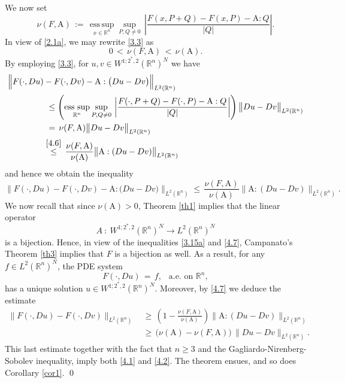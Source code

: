 \documentclass{amsart}
\theoremstyle{definition}
\numberwithin{equation}{section}
\begin{document}
We now set
\[
\nu(F,{\textrm{A}})\, :=\, \underset{x\in {\mathbb{R}}^n}{{\textrm{ess}}\,\sup} \sup_{P,Q\neq 0}\,\left| \frac{F(x,P+Q) -F(x,P) -{\textrm{A}}:Q}{|Q|}\right| .
\]
In view of \eqref{2.1a}, we may rewrite  \eqref{3.3}  as
\begin{equation} \label{3.15a}
0\,<\,  \nu(F,{\textrm{A}})\, <\, \nu({\textrm{A}}).
\end{equation}
By employing \eqref{3.3}, for $u,v \in W^{1;2^*\!,2}({\mathbb{R}}^n)^N$ we have
\begin{align} 
\Big\|F(\cdot,Du) &-  F(\cdot,Dv)  -{\textrm{A}}: \big(Du-Dv \big)\Big\|_{L^2({\mathbb{R}}^n)} \nonumber\\
&\ \leq \left(\underset{{\mathbb{R}}^n}{{\textrm{ess}}\,\sup} \sup_{P,Q\neq 0}\,\left| \frac{F(\cdot,P+Q) -F(\cdot,P) -{\textrm{A}}:Q}{|Q|}\right| \right)
\big\| Du-Dv\big\|_{L^2({\mathbb{R}}^n)}  \nonumber\\
&\ = \, \nu(F,{\textrm{A}}) \big\| Du-Dv\big\|_{L^2({\mathbb{R}}^n)} \nonumber\\
&\overset{\eqref{4.6}}{\leq}\, \frac{\nu(F,{\textrm{A}})}{\nu({\textrm{A}})} \big\|{\textrm{A}}:(Du -Dv)\big\|_{L^2({\mathbb{R}}^n)} \nonumber
\end{align}
and hence we obtain the inequality
\begin{equation}   \label{4.7}
\Big\|F(\cdot,Du) -  F(\cdot,Dv)  -{\textrm{A}}: \big(Du-Dv \big)\Big\|_{L^2({\mathbb{R}}^n)}  \leq \, \frac{\nu(F,{\textrm{A}})}{\nu({\textrm{A}})} \big\|{\textrm{A}}:(Du -Dv)\big\|_{L^2({\mathbb{R}}^n)}  .
\end{equation}
We now recall that since $\nu({\textrm{A}})>0$, Theorem \ref{th1} implies that the linear operator
\[
A\ :\  W^{1;2^*\!,2}({\mathbb{R}}^n)^N {\longrightarrow}  L^2({\mathbb{R}}^n)^N 
\]
is a bijection. Hence, in view of the inequalities \eqref{3.15a}  and \eqref{4.7}, Campanato's Theorem \ref{th3} implies that $F$ is a bijection as well. As a result, for any $f\in L^2({\mathbb{R}}^n)^N$, the PDE system 
\[
F(\cdot, Du)\, =\, f,\ \  \text{ a.e. on }{\mathbb{R}}^n,
\]
has a unique solution $u\in W^{1;2^*\!,2}({\mathbb{R}}^n)^N$. Moreover, by \eqref{4.7} we deduce the estimate
\begin{align} 
\Big\|F(\cdot,Du) -  F(\cdot,Dv)\Big\|_{L^2({\mathbb{R}}^n)} \,  &\geq \, \left(1-\frac{\nu(F,{\textrm{A}})}{\nu({\textrm{A}})} \right) \big\|{\textrm{A}}:(Du -Dv)\big\|_{L^2({\mathbb{R}}^n)}\nonumber \\
&\geq\, \big(\nu({\textrm{A}})-\nu(F,{\textrm{A}}) \big)\, \big\| Du -Dv\big\|_{L^2({\mathbb{R}}^n)} .\nonumber
\end{align}
This last estimate together with the fact that $n\geq 3$ and the Gagliardo-Nirenberg-Sobolev inequality, imply both \eqref{4.1} and  \eqref{4.2}. The theorem ensues, and so does Corollary \ref{cor1}.      \qed
\end{document}
